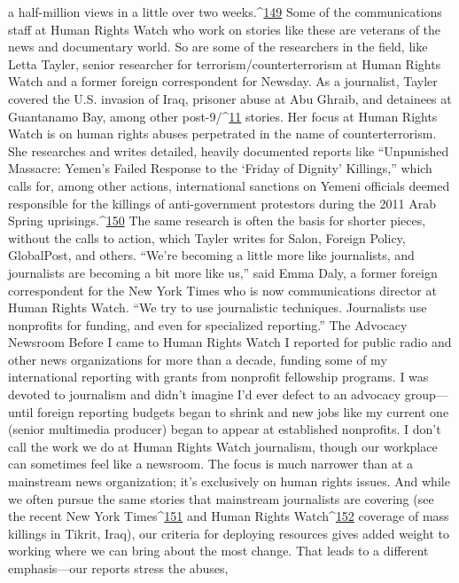 a half-million views in a little over two weeks.^{\href{#endnotes}{149}}
Some of the communications staff at Human Rights Watch who work on stories like
these are veterans of the news and documentary world. So are some of the researchers in
the field, like Letta Tayler, senior researcher for terrorism/counterterrorism at Human
Rights Watch and a former foreign correspondent for Newsday.
As a journalist, Tayler covered the U.S. invasion of Iraq, prisoner abuse at Abu Ghraib,
and detainees at Guantanamo Bay, among other post-9/^{\href{#endnotes}{11}} stories. Her focus at Human
Rights Watch is on human rights abuses perpetrated in the name of counterterrorism. She
researches and writes detailed, heavily documented reports like ``Unpunished Massacre:
Yemen’s Failed Response to the ‘Friday of Dignity’ Killings,'' which calls for, among
other actions, international sanctions on Yemeni officials deemed responsible for the
killings of anti-government protestors during the 2011 Arab Spring uprisings.^{\href{#endnotes}{150}} The
same research is often the basis for shorter pieces, without the calls to action, which
Tayler writes for Salon, Foreign Policy, GlobalPost, and others.
``We’re becoming a little more like journalists, and journalists are becoming a bit more
like us,'' said Emma Daly, a former foreign correspondent for the New York Times who is
now communications director at Human Rights Watch. ``We try to use journalistic
techniques. Journalists use nonprofits for funding, and even for specialized reporting.''
The Advocacy Newsroom
Before I came to Human Rights Watch I reported for public radio and other news
organizations for more than a decade, funding some of my international reporting with
grants from nonprofit fellowship programs. I was devoted to journalism and didn’t
imagine I’d ever defect to an advocacy group—until foreign reporting budgets began to
shrink and new jobs like my current one (senior multimedia producer) began to appear at
established nonprofits.
I don’t call the work we do at Human Rights Watch journalism, though our workplace
can sometimes feel like a newsroom. The focus is much narrower than at a mainstream
news organization; it’s exclusively on human rights issues. And while we often pursue
the same stories that mainstream journalists are covering (see the recent New York
Times^{\href{#endnotes}{151}} and Human Rights Watch^{\href{#endnotes}{152}} coverage of mass killings in Tikrit, Iraq), our
criteria for deploying resources gives added weight to working where we can bring about
the most change. That leads to a different emphasis—our reports stress the abuses,
